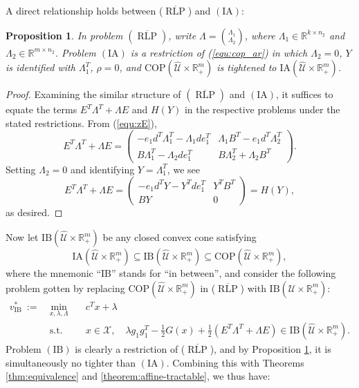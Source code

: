 \documentclass[12pt]{article}
\DeclareMathOperator{\st}{s.t.}
\DeclareMathOperator{\AR}{RLP}
\newtheorem{proposition}{Proposition}
\newcommand{\K}{\widehat{\mathcal{U}}}
\newcommand{\COP}{{\mathrm{COP}}}
\newcommand{\X}{{\mathcal{X}}}
\newcommand{\M}{\mathrm{IA}}
\newcommand{\IB}{\mathrm{IB}}
\def\RR{{\mathbb{R}}}
\newcommand{\Q}{{\K \times \RR^m_+}}
\begin{document}
\begin{onehalfspace}

A direct relationship holds between ($\overline{\AR}$) and $(\M)$:

\begin{proposition} \label{pro:tightening}
In problem $(\overline{\AR})$, write $\Lambda = {\Lambda_1 \choose
\Lambda_2}$, where $\Lambda_1 \in \RR^{k \times n_2}$ and $\Lambda_2
\in \RR^{m \times n_2}$. Problem $(\M)$ is a restriction of
(\ref{equ:cop_ar}) in which $\Lambda_2 = 0$, $Y$ is identified with
$\Lambda_1^T$, $\rho = 0$, and $\COP(\Q)$ is tightened to $\M(\Q)$.
\end{proposition}

\begin{proof}
Examining the similar structure of $(\overline{\AR})$ and $(\M)$,
it suffices to equate the terms $E^T \Lambda^T + \Lambda E$ and
$H(Y)$ in the respective problems under the stated restrictions. From
(\ref{equ:zE}),
\[
    E^T \Lambda^T + \Lambda E =
    \begin{pmatrix}
        -e_1 d^T \Lambda_1^T - \Lambda_1 d e_1^T & \Lambda_1 B^T - e_1 d^T \Lambda_2^T \\
        B \Lambda_1^T - \Lambda_2 d e_1^T & B \Lambda_2^T + \Lambda_2 B^T
    \end{pmatrix}.
\]
Setting $\Lambda_2 = 0$ and identifying $Y = \Lambda_1^T$, we see
\[
    E^T \Lambda^T + \Lambda E = 
    \begin{pmatrix}
        -e_1 d^T Y - Y^T d e_1^T & Y^T B^T \\
        B Y & 0
    \end{pmatrix} =
    H(Y),
\]
as desired.
\end{proof}

Now let $\IB(\Q)$ be any closed convex cone satisfying
\[
    \M(\Q) \subseteq
    \IB(\Q) \subseteq
    \COP(\Q),
\]
where the mnemonic ``IB'' stands for ``in between'', and consider the
following problem gotten by replacing $\COP(\Q)$ in
($\overline{\AR}$) with $\IB(\Q)$:
%
\begin{equation} \tag{$IB$} \label{equ:ccone_ar}
\begin{array}{lll}
v_{\IB}^* \ := \ &\min \limits_{x, \lambda, \Lambda} \quad & c^T x + \lambda \\
&\st & x \in \X, \quad \lambda g_1 g_1^T - \tfrac12 G(x) + \tfrac12(E^T \Lambda^T + \Lambda E) 
\in \IB(\Q).
\end{array}
\end{equation}
%
Problem $(\IB)$ is clearly a restriction of ($\overline{\AR}$), and
by Proposition \ref{pro:tightening}, it is simultaneously no tighter
than $(\M)$. Combining this with Theorems \ref{thm:equivalence} and
\ref{theorem:affine-tractable}, we thus have:


\end{onehalfspace}
\end{document}
